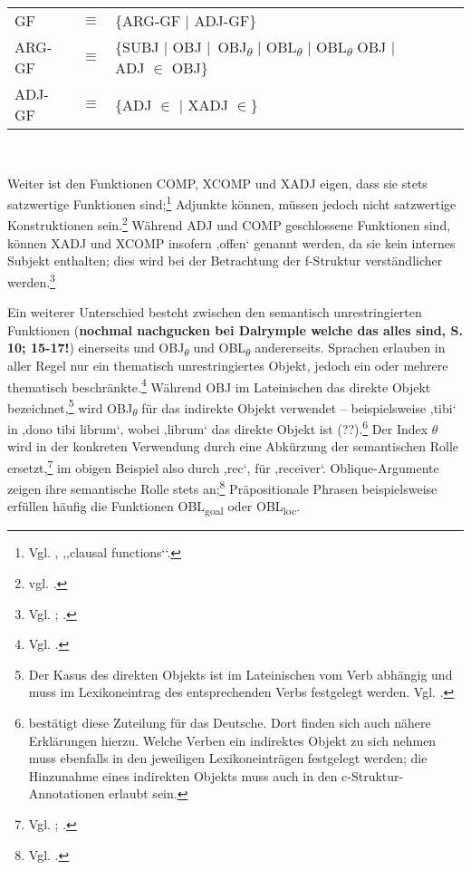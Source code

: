 \documentclass[12pt,a4paper]{article}
\begin{document}
\begin{singlespace}
\begin{tabular}{ l  l  l  c  c  c  c }
GF & $\equiv$ & \{ARG-GF $\mid$ ADJ-GF\} \\
ARG-GF & $\equiv$ & \{SUBJ $\mid$ OBJ $\mid$\ OBJ\textsubscript{$\theta$} $\mid$ OBL\textsubscript{$\theta$} $\mid$ OBL\textsubscript{$\theta$} OBJ $\mid$ ADJ $\in$ OBJ\} \\
ADJ-GF & $\equiv$ & \{ADJ $\in$ $\mid$ XADJ $\in$\} \\
\end{tabular}\\
\end{singlespace}

Weiter ist den Funktionen COMP, XCOMP und XADJ eigen, dass sie stets satzwertige Funktionen sind;\footnote{Vgl. \cite[24]{Dal}, ,,clausal functions‘‘.} Adjunkte können, müssen jedoch nicht satzwertige Konstruktionen sein.\footnote{vgl. \cite[40]{Skript}.} Während ADJ und COMP geschlossene Funktionen sind, können XADJ und XCOMP insofern ,offen‘ genannt werden, da sie kein internes Subjekt enthalten; dies wird bei der Betrachtung der f-Struktur verständlicher werden.\footnote{Vgl. \cite[10; 14; 24]{Dal}; \cite[54]{Skript}.}

Ein weiterer Unterschied besteht zwischen den semantisch unrestringierten Funktionen (\textbf{nochmal nachgucken bei Dalrymple welche das alles sind, S. 10; 15-17!}) einerseits und OBJ\textsubscript{$\theta$} und OBL\textsubscript{$\theta$} andererseits. Sprachen erlauben in aller Regel nur ein thematisch unrestringiertes Objekt, jedoch ein oder mehrere thematisch beschränkte.\footnote{Vgl. \cite[21]{Dal}.} Während OBJ im Lateinischen das direkte Objekt bezeichnet,\footnote{Der Kasus des direkten Objekts ist im Lateinischen vom Verb abhängig und muss im Lexikoneintrag des entsprechenden Verbs festgelegt werden. Vgl. \cite[30]{Skript}.} wird OBJ\textsubscript{$\theta$} für das indirekte Objekt verwendet – beispielsweise ,tibi‘ in ,dono tibi librum‘, wobei ,librum‘ das direkte Objekt ist (??).\footnote{\cite[30]{Skript} bestätigt diese Zuteilung für das Deutsche. Dort finden sich auch nähere Erklärungen hierzu. Welche Verben ein indirektes Objekt zu sich nehmen muss ebenfalls in den jeweiligen Lexikoneinträgen festgelegt werden; die Hinzunahme eines indirekten Objekts muss auch in den c-Struktur-Annotationen erlaubt sein.}  Der Index $\theta$ wird in der konkreten Verwendung durch eine Abkürzung der semantischen Rolle ersetzt,\footnote{Vgl. \cite[32]{Skript}; \cite[21]{Rohrer}.} im obigen Beispiel also durch ,rec‘, für ,receiver‘. Oblique-Argumente zeigen ihre semantische Rolle stets an;\footnote{Vgl. \cite[26]{Dal}.} Präpositionale Phrasen beispielsweise erfüllen häufig die Funktionen OBL\textsubscript{goal} oder OBL\textsubscript{loc}.
\end{document}
